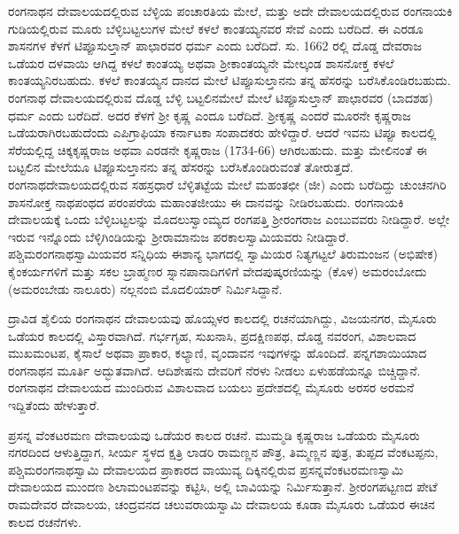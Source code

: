 ರಂಗನಾಥನ ದೇವಾಲಯದಲ್ಲಿರುವ ಬೆಳ್ಳಿಯ ಪಂಚಾರತಿಯ ಮೇಲೆ, ಮತ್ತು ಅದೇ ದೇವಾಲಯದಲ್ಲಿರುವ ರಂಗನಾಯಕಿ ಗುಡಿಯಲ್ಲಿರುವ ಮೂರು ಬೆಳ್ಳಿಬಟ್ಟಲುಗಳ ಮೇಲೆ ಕಳಲೆ ಕಾಂತಯ್ಯನವರ ಸೇವೆ ಎಂದು ಬರೆದಿದೆ. ಈ ಎರಡೂ ಶಾಸನಗಳ ಕೆಳಗೆ ಟಿಪ್ಪೂಸುಲ್ತಾನ್​ ಪಾಛಾರವರ ಧರ್ಮ ಎಂದು ಬರೆದಿದೆ. ಸು. 1662 ರಲ್ಲಿ ದೊಡ್ಡ ದೇವರಾಜ ಒಡೆಯರ ದಳವಾಯಿ ಆಗಿದ್ದ ಕಳಲೆ ಕಾಂತಯ್ಯ ಅಥವಾ ಶ‍್ರೀಕಾಂತಯ್ಯನೇ ಮೇಲ್ಕಂಡ ಶಾಸನೋಕ್ತ ಕಳಲೆ ಕಾಂತಯ್ಯನಿರಬಹುದು. ಕಳಲೆ ಕಾಂತಯ್ಯನ ದಾನದ ಮೇಲೆ ಟಿಪ್ಪೂಸುಲ್ತಾನನು ತನ್ನ ಹೆಸರನ್ನು ಬರೆಸಿಕೊಂಡಿರಬಹುದು. ರಂಗನಾಥ ದೇವಾಲಯದಲ್ಲಿರುವ ದೊಡ್ಡ ಬೆಳ್ಳಿ ಬಟ್ಟಲಿನಮೇಲೆ ಮೇಲೆ ಟಿಪ್ಪೂಸುಲ್ತಾನ್​ ಪಾಛಾರವರ (ಬಾದಶಹ) ಧರ್ಮ ಎಂದು ಬರೆದಿದೆ. ಅದರ ಕೆಳಗೆ ಶ‍್ರೀ ಕೃಷ್ಣ ಎಂದೂ ಬರೆದಿದೆ. ಶ‍್ರೀಕೃಷ್ಣ ಎಂದರೆ ಮೂರನೇ ಕೃಷ್ಣರಾಜ ಒಡೆಯರಾಗಿರಬಹುದೆಂದು ಎಪಿಗ್ರಾಫಿಯಾ ಕರ್ನಾಟಕಾ ಸಂಪಾದಕರು ಹೇಳಿದ್ದಾರೆ. ಆದರೆ ಇವನು ಟಿಪ್ಪೂ ಕಾಲದಲ್ಲಿ ಸೆರೆಯಲ್ಲಿದ್ದ ಚಿಕ್ಕಕೃಷ್ಣರಾಜ ಅಥವಾ ಎರಡನೇ ಕೃಷ್ಣರಾಜ (1734-66) ಆಗಿರಬಹುದು. ಮತ್ತು ಮೇಲಿನಂತೆ ಈ ಬಟ್ಟಲಿನ ಮೇಲೆಯೂ ಟಿಪ್ಪೂಸುಲ್ತಾನನು ತನ್ನ ಹೆಸರನ್ನು ಬರೆಸಿಕೊಂಡಿರುವಂತೆ ತೋರುತ್ತದೆ. ರಂಗನಾಥದೇವಾಲಯದಲ್ಲಿರುವ ಸಹಸ್ರಧಾರೆ ಬೆಳ್ಳಿತಟ್ಟೆಯ ಮೇಲೆ ಮಹಂತಛೀ (ಜೀ) ಎಂದು ಬರೆದಿದ್ದು ಚುಂಚನಗಿರಿ ಶಾಸನೋಕ್ತ ನಾಥಪಂಥದ ಪರಂಪರೆಯ ಮಹಾಂತಜೀಯು ಈ ದಾನವನ್ನು ನೀಡಿರಬಹುದು. ರಂಗನಾಯಕಿ ದೇವಾಲಯಕ್ಕೆ ಒಂದು ಬೆಳ್ಳಿಬಟ್ಟಲನ್ನು ಮೊದಲು\-ಸ್ವಾಂಮ್ಯದ ರಂಗಪತ್ತಿ ಶ‍್ರೀರಂಗರಾಜ ಎಂಬುವವರು ನೀಡಿದ್ದಾರೆ. ಅಲ್ಲೇ ಇರುವ ಇನ್ನೊಂದು ಬೆಳ್ಳಿಗಿಂಡಿಯನ್ನು ಶ‍್ರೀರಾಮಾನುಜ ಪರಕಾಲಸ್ವಾಮಿಯವರು ನೀಡಿದ್ದಾರೆ. ಪಶ್ಚಿಮರಂಗನಾಥಸ್ವಾಮಿಯವರ ಸನ್ನಿಧಿಯ ಈಶಾನ್ಯ ಭಾಗದಲ್ಲಿ ಸ್ವಾಮಿಯರ ನಿತ್ಯಗಟ್ಟಲೆ ತಿರುಮಂಜನ (ಅಭಿಷೇಕ) ಕೈಂಕರ್ಯಗಳಿಗೆ ಮತ್ತು ಸಕಲ ಬ್ರಾಹ್ಮಣರ ಸ್ನಾನಪಾನಾದಿಗಳಿಗೆ ವೇದಪುಷ್ಕರಣಿಯನ್ನು (ಕೊಳ) ಅಮರಂಬೋದು (ಅಮರಂಬೇಡು ನಾಲೂರು) ನಲ್ಲನಂಬಿ ಮೊದಲಿಯಾರ್​ ನಿರ್ಮಿಸಿದ್ದಾನೆ.

ದ್ರಾವಿಡ ಶೈಲಿಯ ರಂಗನಾಥನ ದೇವಾಲಯವು ಹೊಯ್ಸಳರ ಕಾಲದಲ್ಲಿ ರಚನೆಯಾಗಿದ್ದು, ವಿಜಯನಗರ, ಮೈಸೂರು ಒಡೆಯರ ಕಾಲದಲ್ಲಿ ವಿಸ್ತಾರವಾಗಿದೆ. ಗರ್ಭಗೃಹ, ಸುಖನಾಸಿ, ಪ್ರದಕ್ಷಿಣಪಥ, ದೊಡ್ಡ ನವರಂಗ, ವಿಶಾಲವಾದ ಮುಖಮಂಟಪ, ಕೈಸಾಲೆ ಅಥವಾ ಪ್ರಾಕಾರ, ಕಲ್ಯಾಣಿ, ವೃಂದಾವನ ಇವುಗಳನ್ನು ಹೊಂದಿದೆ. ಪನ್ನಗಶಾಯಿಯಾದ ರಂಗನಾಥನ ಮೂರ್ತಿ ಅದ್ಭುತವಾಗಿದೆ. ಆದಿಶೇಷನು ದೇವರಿಗೆ ನೆರಳು ನೀಡಲು ಏಳುಹಡೆಯನ್ನೂ ಬಿಚ್ಚಿದ್ದಾನೆ. ರಂಗನಾಥನ ದೇವಾಲಯದ ಮುಂದಿರುವ ವಿಶಾಲವಾದ ಬಯಲು ಪ್ರದೇಶದಲ್ಲಿ ಮೈಸೂರು ಅರಸರ ಅರಮನೆ ಇದ್ದಿತೆಂದು ಹೇಳುತ್ತಾರೆ.

ಪ್ರಸನ್ನ ವೆಂಕಟರಮಣ ದೇವಾಲಯವು ಒಡೆಯರ ಕಾಲದ ರಚನೆ. ಮುಮ್ಮಡಿ ಕೃಷ್ಣರಾಜ ಒಡೆಯರು ಮೈಸೂರು ನಗರದಿಂದ ಆಳುತ್ತಿದ್ದಾಗ, ಸೀರ್ಯ ಸ್ಥಳದ ಕ್ಷತ್ರಿ ಲಾಡರಿ ರಾಮಣ್ಣನ ಪೌತ್ರ, ತಿಮ್ಮಣ್ಣನ ಪುತ್ರ, ತುಪ್ಪದ ವೆಂಕಟಪ್ಪನು, ಪಶ್ಚಿಮರಂಗನಾಥಸ್ವಾಮಿ ದೇವಾಲಯದ ಪ್ರಾಕಾರದ ವಾಯುವ್ಯ ದಿಕ್ಕಿನಲ್ಲಿರುವ ಪ್ರಸನ್ನವೆಂಕಟರಮಣಸ್ವಾಮಿ ದೇವಾಲಯದ ಮುಂದಣ ಶಿಲಾಮಂಟಪವನ್ನು ಕಟ್ಟಿಸಿ, ಅಲ್ಲಿ ಬಾವಿಯನ್ನು ನಿರ್ಮಿಸುತ್ತಾನೆ. ಶ‍್ರೀರಂಗಪಟ್ಟಣದ ಪೇಟೆ ರಾಮದೇವರ ದೇವಾಲಯ, ಚಂದ್ರವನದ ಚಲುವರಾಯಸ್ವಾಮಿ ದೇವಾಲಯ ಕೂಡಾ ಮೈಸೂರು ಒಡೆಯರ ಈಚಿನ ಕಾಲದ ರಚನೆಗಳು.

